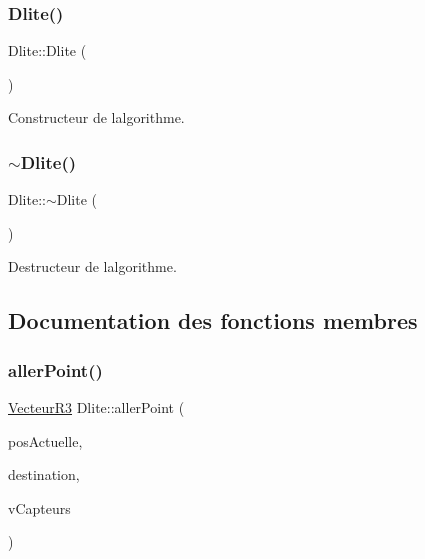 \subsubsection{\texorpdfstring{Dlite()}{Dlite()}}
{\footnotesize\ttfamily Dlite\+::\+Dlite (\begin{DoxyParamCaption}{ }\end{DoxyParamCaption})}

Constructeur de l\textquotesingle{}algorithme. \mbox{\label{class_dlite_ab98746140c7aa4ded45a47459b4c47d5}} 
\subsubsection{\texorpdfstring{$\sim$\+Dlite()}{~Dlite()}}
{\footnotesize\ttfamily Dlite\+::$\sim$\+Dlite (\begin{DoxyParamCaption}{ }\end{DoxyParamCaption})\hspace{0.3cm}{\ttfamily [virtual]}}

Destructeur de l\textquotesingle{}algorithme. 

\subsection{Documentation des fonctions membres}
\mbox{\label{class_dlite_a78c005fea65d3ae2429f74fd1d63c581}} 
\subsubsection{\texorpdfstring{aller\+Point()}{allerPoint()}}
{\footnotesize\ttfamily \mbox{\hyperlink{class_vecteur_r3}{Vecteur\+R3}} Dlite\+::aller\+Point (\begin{DoxyParamCaption}\item[{\mbox{\hyperlink{class_vecteur_r3}{Vecteur\+R3}}}]{pos\+Actuelle,  }\item[{\mbox{\hyperlink{class_vecteur_r3}{Vecteur\+R3}}}]{destination,  }\item[{std\+::vector$<$ \mbox{\hyperlink{class_capteur}{Capteur}} $>$}]{v\+Capteurs }\end{DoxyParamCaption})}

